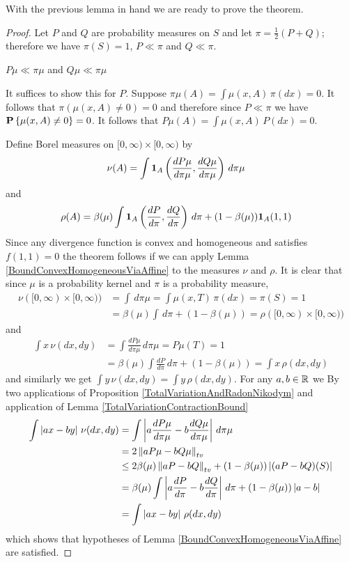 With the previous lemma in hand we are ready to prove the theorem.
\begin{proof}
Let $P$ and $Q$ are probability measures on $S$ and let $\pi = \frac{1}{2}(P + Q)$; therefore we have $\pi(S)=1$,  $P \ll \pi$ and $Q \ll \pi$.
\begin{clm} $P \mu \ll \pi \mu$ and $Q \mu \ll \pi \mu$
\end{clm}
It suffices to show this for $P$.  Suppose $\pi \mu (A) = \int \mu(x, A) \, \pi(dx) = 0$.  It follows that $\pi(\mu(x, A)  \neq 0) = 0$ and therefore since $P \ll \pi$ we have $\textbf{P}\left \{\mu(x, A)  \neq 0 \right \}= 0$.  It follows that $P \mu(A) = \int \mu(x, A) \, P(dx) = 0$.

Define Borel measures on $[0, \infty) \times [0,\infty)$ by  
\begin{align*}
\nu(A) &= \int \textbf{1}_{A} \left( \frac{d P \mu}{d \pi \mu}, \frac{d Q \mu}{d \pi \mu} \right) \, d \pi \mu
\end{align*}
and
\begin{align*}
\rho(A) &= \beta(\mu ) \int \textbf{1}_{A} \left( \frac{d P}{d \pi}, \frac{d Q}{d \pi} \right) \, d \pi + (1 - \beta(\mu))  \textbf{1}_{A}(1,1)
\end{align*}
Since any divergence function is convex and homogeneous and satisfies $f(1,1) = 0$ the theorem follows if we can apply Lemma \ref{BoundConvexHomogeneousViaAffine} to the measures $\nu$ and $\rho$.  It is clear that since $\mu$ is a probability kernel and $\pi$ is a probability measure,
\begin{align*}
\nu([0, \infty) \times [0,\infty)) &= \int \, d \pi \mu = \int \mu(x,T) \, \pi(dx)  =  \pi(S) = 1\\
&=\beta(\mu) \int \, d \pi + (1 - \beta(\mu)) = \rho([0, \infty) \times [0,\infty))
\end{align*}  
and
\begin{align*}
\int x \, \nu(dx, dy) &= \int \frac{d P \mu}{d \pi \mu} \, d \pi \mu = P \mu (T) = 1 \\
&= \beta(\mu) \int \frac{d P}{d \pi} \, d \pi + (1 - \beta(\mu)) = \int x \, \rho(dx, dy)
\end{align*}
and similarly we get $\int y \, \nu(dx, dy) = \int y \, \rho(dx, dy)$.  For any $a, b \in \mathbb{R}$ we 
By two applications of Proposition \ref{TotalVariationAndRadonNikodym} and application of Lemma \ref{TotalVariationContractionBound}
\begin{align*}
\int \left \vert a x - b y \right \vert \, \nu(dx,dy) 
&=\int \left \vert a \frac{d P \mu}{d \pi \mu} - b \frac{d Q \mu}{d\pi \mu} \right \vert \, d \pi \mu \\
&= 2 \left \lVert  a P \mu - b Q \mu \right \rVert_{tv} \\
&\leq 2 \beta(\mu) \left \lVert  a P  - b Q  \right \rVert_{tv} + (1 - \beta(\mu)) \left \vert (aP - bQ)(S) \right \vert \\
&= \beta(\mu) \int \left \vert a \frac{dP}{d\pi}  - b \frac{dQ}{d\pi}  \right \vert \, d\pi + (1 - \beta(\mu)) \left \vert a - b \right \vert \\
&= \int \left \vert a x - b y \right \vert \, \rho(dx, dy)
\end{align*}
which shows that hypotheses of Lemma \ref{BoundConvexHomogeneousViaAffine} are satisfied.
\end{proof}

